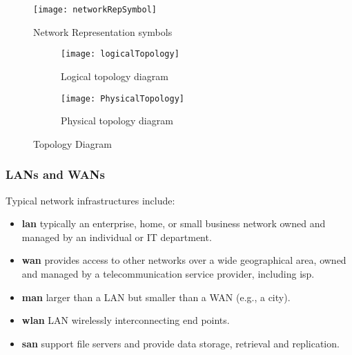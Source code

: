 \documentclass[crop=false]{standalone}
\begin{document}
\begin{figure}[ht]
  \centering
  \texttt{[image: networkRepSymbol]}
  \caption{Network Representation symbols}
  \label{fig:Network Representation symbols}
\end{figure}

\begin{figure}[ht]
    \centering
    \begin{subfigure}{.5\textwidth}
      \centering
      \texttt{[image: logicalTopology]}
      \caption{Logical topology diagram}
      \label{fig:Logical topology diagram}
      \end{subfigure}%
    \begin{subfigure}{.5\textwidth}
      \centering
      \texttt{[image: PhysicalTopology]}
      \caption{Physical topology diagram}
      \label{fig:Physical topology diagram}
    \end{subfigure}
    \caption{Topology Diagram}
    \label{fig:Topology Diagram}
\end{figure}

\subsubsection{LANs and WANs}
Typical network infrastructures include:

\begin{itemize}
  \item \textbf{\acrfull{lan}} \hspace{5mm}typically an enterprise, home, or small business network owned and managed by an individual or IT department.
  \item \textbf{\acrfull{wan}} \hspace{5mm}provides access to other networks over a wide geographical area, owned and managed by a telecommunication service provider, including \acrfull{isp}.
  \item \textbf{\acrfull{man}} \hspace{5mm}larger than a LAN but smaller than a WAN (e.g., a city).
  \item \textbf{\acrfull{wlan}} \hspace{5mm}LAN wirelessly interconnecting end points.
  \item \textbf{\acrfull{san}} \hspace{5mm}support file servers and provide data storage, retrieval and replication.
\end{itemize}
\end{document}
